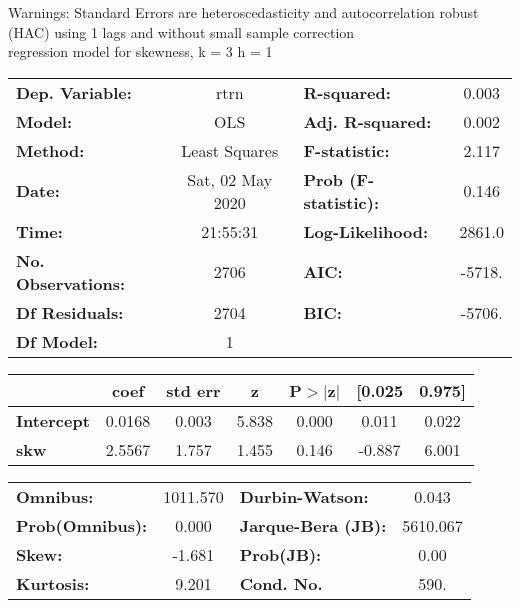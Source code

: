 Warnings: \newline
 [1] Standard Errors are heteroscedasticity and autocorrelation robust (HAC) using 1 lags and without small sample correction\\ 

regression model for skewness, k = 3 h = 1\begin{center}
\begin{tabular}{lclc}
\toprule
\textbf{Dep. Variable:}    &       rtrn       & \textbf{  R-squared:         } &     0.003   \\
\textbf{Model:}            &       OLS        & \textbf{  Adj. R-squared:    } &     0.002   \\
\textbf{Method:}           &  Least Squares   & \textbf{  F-statistic:       } &     2.117   \\
\textbf{Date:}             & Sat, 02 May 2020 & \textbf{  Prob (F-statistic):} &    0.146    \\
\textbf{Time:}             &     21:55:31     & \textbf{  Log-Likelihood:    } &    2861.0   \\
\textbf{No. Observations:} &        2706      & \textbf{  AIC:               } &    -5718.   \\
\textbf{Df Residuals:}     &        2704      & \textbf{  BIC:               } &    -5706.   \\
\textbf{Df Model:}         &           1      & \textbf{                     } &             \\
\bottomrule
\end{tabular}
\begin{tabular}{lcccccc}
                   & \textbf{coef} & \textbf{std err} & \textbf{z} & \textbf{P$> |$z$|$} & \textbf{[0.025} & \textbf{0.975]}  \\
\midrule
\textbf{Intercept} &       0.0168  &        0.003     &     5.838  &         0.000        &        0.011    &        0.022     \\
\textbf{skw}       &       2.5567  &        1.757     &     1.455  &         0.146        &       -0.887    &        6.001     \\
\bottomrule
\end{tabular}
\begin{tabular}{lclc}
\textbf{Omnibus:}       & 1011.570 & \textbf{  Durbin-Watson:     } &    0.043  \\
\textbf{Prob(Omnibus):} &   0.000  & \textbf{  Jarque-Bera (JB):  } & 5610.067  \\
\textbf{Skew:}          &  -1.681  & \textbf{  Prob(JB):          } &     0.00  \\
\textbf{Kurtosis:}      &   9.201  & \textbf{  Cond. No.          } &     590.  \\
\bottomrule
\end{tabular}
\end{center}

